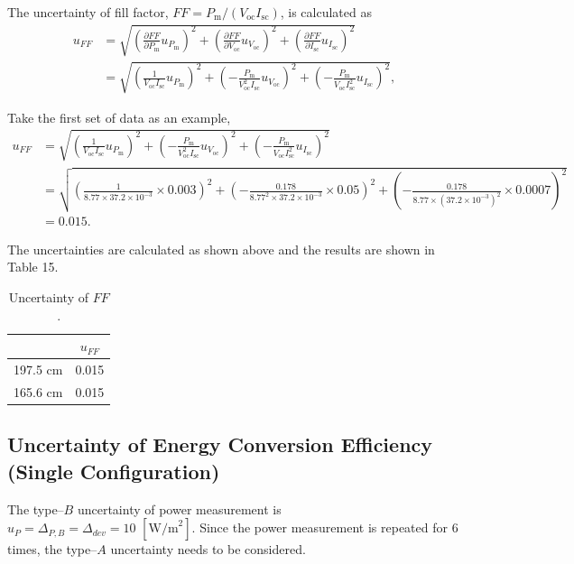 \documentclass{article}
\begin{document}
{The uncertainty of fill factor, $FF = P_\text{m}/(V_\text{oc}I_\text{sc})$, is calculated as
\begin{align*}
    u_{FF} & = \sqrt{(\frac{\partial FF}{\partial P_\text{m}}u_{P_\text{m}})^2 + (\frac{\partial FF}{\partial V_\text{oc}}u_{V_\text{oc}})^2 + (\frac{\partial FF}{\partial I_\text{sc}}u_{I_\text{sc}})^2}   \\
           & = \sqrt{(\frac{1}{V_\text{oc}I_\text{sc}}u_{P_\text{m}})^2 + (-\frac{P_\text{m}}{V_\text{oc}^2I_\text{sc}}u_{V_\text{oc}})^2 + (-\frac{P_\text{m}}{V_\text{oc}I_\text{sc}^2}u_{I_\text{sc}})^2},
\end{align*}

Take the first set of data as an example,
\begin{align*}
    u_{FF} & = \sqrt{(\frac{1}{V_\text{oc}I_\text{sc}}u_{P_\text{m}})^2 + (-\frac{P_\text{m}}{V_\text{oc}^2I_\text{sc}}u_{V_\text{oc}})^2 + (-\frac{P_\text{m}}{V_\text{oc}I_\text{sc}^2}u_{I_\text{sc}})^2}      \\
           & = \sqrt{(\frac{1}{8.77\times 37.2\times 10^{-3}}\times 0.003)^2 + (-\frac{0.178}{8.77^2\times 37.2\times 10^{-3}}\times 0.05)^2 + (-\frac{0.178}{8.77\times (37.2\times 10^{-3})^2}\times 0.0007)^2} \\
           & = 0.015.
\end{align*}

The uncertainties are calculated as shown above and the results are shown in Table 15.

\begin{table}[H]\centering
    \begin{tabular}{cc}
        \toprule
                 & $u_{FF}$ \\
        \midrule
        197.5 cm & 0.015    \\
        165.6 cm & 0.015    \\
        \bottomrule
    \end{tabular}
    \caption{Uncertainty of $FF$.}\label{tab:uncFF}
\end{table}

\subsection{Uncertainty of Energy Conversion Efficiency (Single Configuration)}
The type--$B$ uncertainty of power measurement is $u_{P} = \Delta_{P,B} = \Delta_{dev} = 10\,\,[\text{W/m}^2]$. Since the power measurement is repeated for 6 times, the type--$A$ uncertainty needs to be considered.

}
\end{document}
